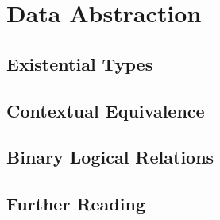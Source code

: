 \chapter{Data Abstraction}

\section{Existential Types}

\section{Contextual Equivalence}

\section{Binary Logical Relations}

\section{Further Reading}
